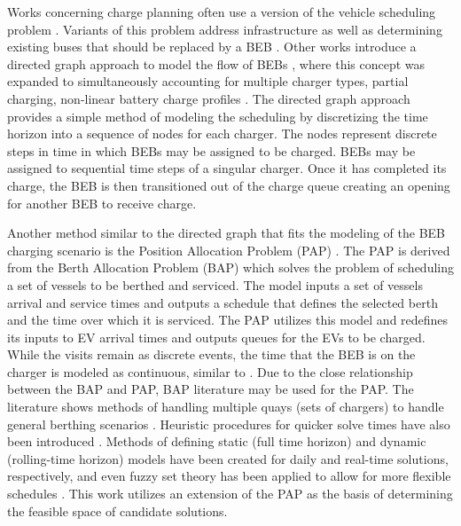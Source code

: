 \documentclass[11pt,a4paper,final]{article}
\begin{document}
Works concerning charge planning often use a version of the vehicle scheduling problem \cite{tang-2019-robus-sched,li-2014-trans-bus,he-2020-optim-charg}. Variants of this problem address infrastructure as well as determining
existing buses that should be replaced by a BEB \cite{zhou-2020-bi-objec,duan-2021-refor-mixed,rinaldi-2020-mixed-fleet,zhou-2020-collab-optim}. Other works introduce a directed graph approach to model the flow
of BEBs \cite{whitaker-2023-a-network,liu-2020-batter-elect}, where this concept was expanded to simultaneously
accounting for multiple charger types, partial charging, non-linear battery charge profiles
\cite{whitaker-2023-a-network}. The directed graph approach provides a simple method of modeling the scheduling by
discretizing the time horizon into a sequence of nodes for each charger. The nodes represent discrete steps in time in
which BEBs may be assigned to be charged. BEBs may be assigned to sequential time steps of a singular charger. Once it
has completed its charge, the BEB is then transitioned out of the charge queue creating an opening for another BEB to
receive charge.

Another method similar to the directed graph that fits the modeling of the BEB charging scenario is the Position
Allocation Problem (PAP) \cite{qarebagh-2019-optim-sched}. The PAP is derived from the Berth Allocation Problem (BAP)
which solves the problem of scheduling a set of vessels to be berthed and serviced. The model inputs a set of vessels
arrival and service times and outputs a schedule that defines the selected berth and the time over which it is serviced.
The PAP utilizes this model and redefines its inputs to EV arrival times and outputs queues for the EVs to be charged.
While the visits remain as discrete events, the time that the BEB is on the charger is modeled as continuous, similar to
\cite{frojan-2015-contin-berth,qarebagh-2019-optim-sched,zhou-2020-collab-optim}. Due to the close relationship
between the BAP and PAP, BAP literature may be used for the PAP. The literature shows methods of handling multiple quays
(sets of chargers) to handle general berthing scenarios \cite{frojan-2015-contin-berth,dai-2008-suppl-chain-analy}.
Heuristic procedures for quicker solve times have also been introduced \cite{imai-2001-dynam-berth}. Methods of
defining static (full time horizon) and dynamic (rolling-time horizon) models have been created for daily and real-time
solutions, respectively, and even fuzzy set theory has been applied to allow for more flexible schedules
\cite{bello-2019-fuzzy-activ,dai-2008-suppl-chain-analy,buhrkal-2011-model-discr,frojan-2015-contin-berth}. This
work utilizes an extension of the PAP as the basis of determining the feasible space of candidate solutions.
\end{document}
